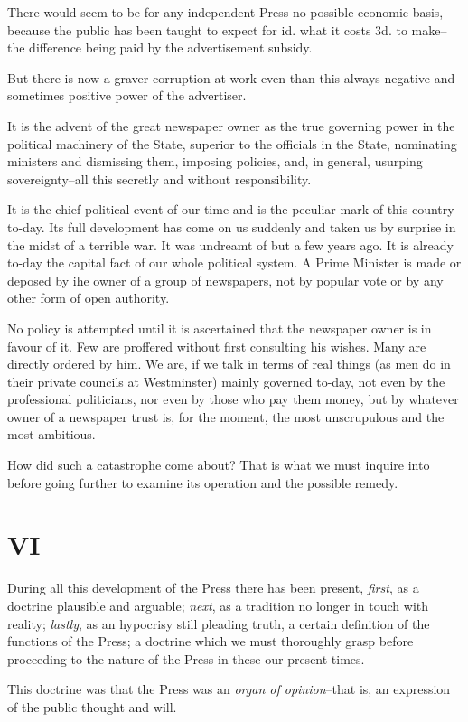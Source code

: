 \documentclass{book}
\begin{document}
There would seem to be for any independent Press no possible economic basis, because the public has been taught to expect for id. what it costs 3d. to make–the difference being paid by the advertisement subsidy.

But there is now a graver corruption at work even than this always negative and sometimes positive power of the advertiser.

It is the advent of the great newspaper owner as the true governing power in the political machinery of the State, superior to the officials in the State, nominating ministers and dismissing them, imposing policies, and, in general, usurping sovereignty–all this secretly and without responsibility.

It is the chief political event of our time and is the peculiar mark of this country to-day. Its full development has come on us suddenly and taken us by surprise in the midst of a terrible war. It was undreamt of but a few years ago. It is already to-day the capital fact of our whole political system. A Prime Minister is made or deposed by ihe owner of a group of newspapers, not by popular vote or by any other form of open authority.

No policy is attempted until it is ascertained that the newspaper owner is in favour of it. Few are proffered without first consulting his wishes. Many are directly ordered by him. We are, if we talk in terms of real things (as men do in their private councils at Westminster) mainly governed to-day, not even by the professional politicians, nor even by those who pay them money, but by whatever owner of a newspaper trust is, for the moment, the most unscrupulous and the most ambitious.

How did such a catastrophe come about? That is what we must inquire into before going further to examine its operation and the possible remedy.

\chapter*{VI}
\label{chapter-7}
During all this development of the Press there has been present, \emph{first}, as a doctrine plausible and arguable; \emph{next}, as a tradition no longer in touch with reality; \emph{lastly}, as an hypocrisy still pleading truth, a certain definition of the functions of the Press; a doctrine which we must thoroughly grasp before proceeding to the nature of the Press in these our present times.

This doctrine was that the Press was an \emph{organ of opinion}–that is, an expression of the public thought and will.
\end{document}
